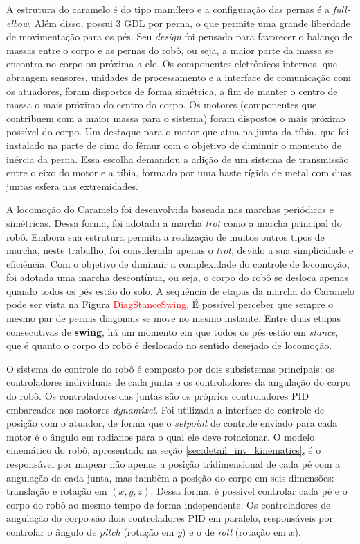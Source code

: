 \documentclass[../main.tex]{subfiles}
\begin{document}
A estrutura do caramelo é do tipo mamífero e a configuração das pernas é a \textit{full-elbow}. Além disso, possui 3 GDL por perna, o que permite uma grande liberdade de movimentação para os pés. Seu \textit{design} foi pensado para favorecer o balanço de massas entre o corpo e as pernas do robô, ou seja, a maior parte da massa se encontra no corpo ou próxima a ele. Os componentes eletrônicos internos, que abrangem sensores, unidades de processamento e a interface de comunicação com os atuadores, foram dispostos de forma simétrica, a fim de manter o centro de massa o mais próximo do centro do corpo. Os motores (componentes que contribuem com a maior massa para o sistema) foram dispostos o mais próximo possível do corpo. Um destaque para o motor que atua na junta da tíbia, que foi instalado na parte de cima do fêmur com o objetivo de diminuir o momento de inércia da perna. Essa escolha demandou a adição de um sistema de transmissão entre o eixo do motor e a tíbia, formado por uma haste rígida de metal com duas juntas esfera nas extremidades.

A locomoção do Caramelo foi desenvolvida baseada nas marchas periódicas e simétricas. Dessa forma, foi adotada a marcha \textit{trot} como a marcha principal do robô. Embora sua estrutura permita a realização de muitos outros tipos de marcha, neste trabalho, foi considerada apenas o \textit{trot}, devido a sua simplicidade e eficiência. Com o objetivo de diminuir a complexidade do controle de locomoção, foi adotada uma marcha descontínua, ou seja, o corpo do robô se desloca apenas quando todos os pés estão do solo. A sequência de etapas da marcha do Caramelo pode ser vista na Figura \textcolor{red}{DiagStanceSwing}. É possível perceber que sempre o mesmo par de pernas diagonais se move no mesmo instante. Entre duas etapas consecutivas de \textbf{swing}, há um momento em que todos os pés estão em \textit{stance}, que é quanto o corpo do robô é deslocado no sentido desejado de locomoção.

O sistema de controle do robô é composto por dois subsistemas principais: os controladores individuais de cada junta e os controladores da angulação do corpo do robô. Os controladores das juntas são os próprios controladores PID embarcados nos motores \textit{dynamixel}. Foi utilizada a interface de controle de posição com o atuador, de forma que o \textit{setpoint} de controle enviado para cada motor é o ângulo em radianos para o qual ele deve rotacionar. O modelo cinemático do robô, apresentado na seção \ref{sec:detail_inv_kinematics}, é o responsável por mapear não apenas a posição tridimensional de cada pé com a angulação de cada junta, mas também a posição do corpo em seis dimensões: translação e rotação em $(x, y, z)$. Dessa forma, é possível controlar cada pé e o corpo do robô ao mesmo tempo de forma independente. Os controladores de angulação do corpo são dois controladores PID em paralelo, responsáveis por controlar o ângulo de \textit{pitch} (rotação em $y$) e o de \textit{roll} (rotação em $x$).
\end{document}
